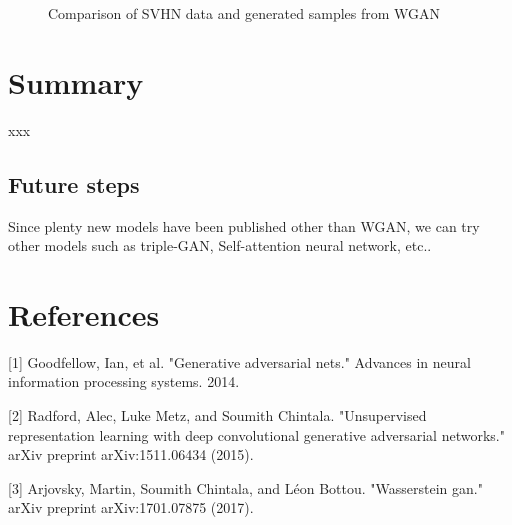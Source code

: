 \documentclass{article}
\begin{document}
\begin{figure}[!htb]
  \centering
  \caption{Comparison of SVHN data and generated samples from WGAN}
\end{figure}

\section{Summary}

xxx

\subsection{Future steps}

Since plenty new models have been published other than WGAN, we can try other models such as triple-GAN, Self-attention neural network, etc..

\section*{References}

[1] Goodfellow, Ian, et al. "Generative adversarial nets." Advances in neural information processing systems. 2014.

[2] Radford, Alec, Luke Metz, and Soumith Chintala. "Unsupervised representation learning with deep convolutional generative adversarial networks." arXiv preprint arXiv:1511.06434 (2015).

[3] Arjovsky, Martin, Soumith Chintala, and Léon Bottou. "Wasserstein gan." arXiv preprint arXiv:1701.07875 (2017).
\end{document}
